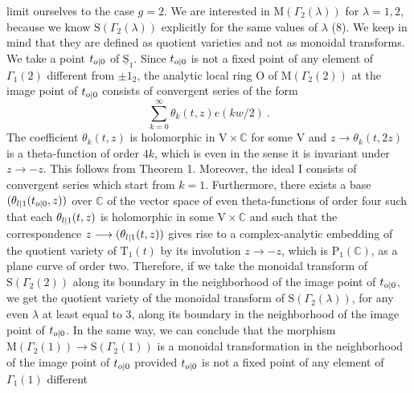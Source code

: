 limit ourselves to the case $g=2$. We are interested in $\mathrm{M}(\Gamma_2(\lambda))$ for $\lambda=1,2$, because we know $\mathrm{S}(\Gamma_2(\lambda))$ explicitly for the same values of $\lambda$ (8). We keep in mind that they are defined as quotient varieties and not as monoidal transforms. We take a point $t_{o|0}$ of $\underline{\mathrm{S}}_1$. Since $t_{o|0}$ is not a fixed point of any element of $\Gamma_1(2)$ different from $\pm1_2$, the analytic local ring $\mathrm{O}$ of $\mathrm{M}(\Gamma_2(2))$ at the image point of $t_{o|0}$ consists of convergent series of the form
\[
\sum_{k=0}^{\infty}\theta_k(t,z)e(kw/2)\ .
\]
The coefficient $\theta_k(t,z)$ is holomorphic in $\mathrm{V}\times\mathbb{C}$ for some $\mathrm{V}$ and $z\longrightarrow\theta_k(t,2z)$ is a theta-function of order $4k$, which is even in the sense it is invariant under $z\longrightarrow-z$. This follows from Theorem 1. Moreover, the ideal $\mathrm{I}$ consists of convergent series which start from $k=1$. Furthermore, there exists a base $(\theta_{l|1}(t_{o|0},z))$ over $\mathbb{C}$ of the vector space of even theta-functions of order four such that each $\theta_{l|1}(t,z)$ is holomorphic in some $\mathrm{V}\times\mathbb{C}$ and such that the correspondence $z\longrightarrow(\theta_{l|1}(t,z))$ gives rise to a complex-analytic embedding of the quotient variety of $\mathrm{T}_1(t)$ by its involution $z\longrightarrow-z$, which is $\mathrm{P}_1(\mathbb{C})$, as a plane curve of order two. Therefore, if we take the monoidal transform of $\mathrm{S}(\Gamma_2(2))$ along its boundary in the neighborhood of the image point of $t_{o|0}$, we get the quotient variety of the monoidal transform of $\mathrm{S}(\Gamma_2(\lambda))$, for any even $\lambda$ at least equal to 3, along its boundary in the neighborhood of the image point of $t_{o|0}$. In the same way, we can conclude that the morphism $\mathrm{M}(\Gamma_2(1))\longrightarrow\mathrm{S}(\Gamma_2(1))$ is a monoidal transformation in the neighborhood of the image point of $t_{o|0}$ provided $t_{o|0}$ is not a fixed point of any element of $\Gamma_1(1)$ different
